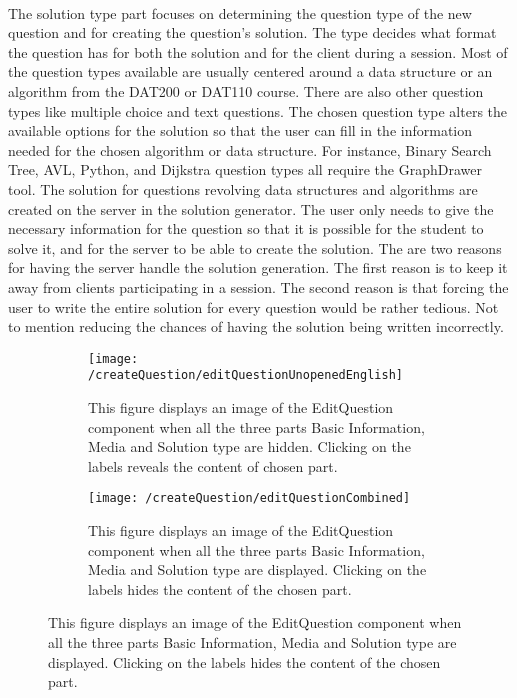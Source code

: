 \\[11pt]
The solution type part focuses on determining the question type of the new question and for creating the question's solution. The type decides what format the question has for both the solution and for the client during a session. Most of the question types available are usually centered around a data structure or an algorithm from the DAT200 or DAT110 course. There are also other question types like multiple choice and text questions. The chosen question type alters the available options for the solution so that the user can fill in the information needed for the chosen algorithm or data structure. For instance, Binary Search Tree, AVL, Python, and Dijkstra question types all require the GraphDrawer tool. The solution for questions revolving data structures and algorithms are created on the server in the solution generator. The user only needs to give the necessary information for the question so that it is possible for the student to solve it, and for the server to be able to create the solution. The are two reasons for having the server handle the solution generation. The first reason is to keep it away from clients participating in a session. The second reason is that forcing the user to write the entire solution for every question would be rather tedious. Not to mention reducing the chances of having the solution being written incorrectly.
\begin{figure}[H]
    \centering
    \begin{subfigure}{0.70\linewidth}
        \texttt{[image: /createQuestion/editQuestionUnopenedEnglish]}
        \caption{This figure displays an image of the EditQuestion component when all the three parts Basic Information, Media and Solution type are hidden. Clicking on the labels reveals the content of chosen part.}
        \label{fig:editquestionUnopened}
    \end{subfigure}
    \begin{subfigure}{0.70\linewidth}
        \texttt{[image: /createQuestion/editQuestionCombined]}
        \caption{This figure displays an image of the EditQuestion component when all the three parts Basic Information, Media and Solution type are displayed. Clicking on the labels hides the content of the chosen part.}
        \label{fig:editquestionOpened}
    \end{subfigure}
\end{figure}
\noindent
